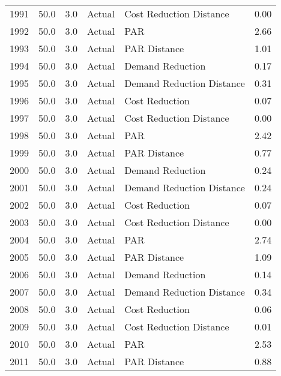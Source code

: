 \begin{longtable}{lrrllr}
1991 &         50.0 &     3.0 &         Actual &    Cost Reduction Distance &   0.00 \\
1992 &         50.0 &     3.0 &         Actual &                        PAR &   2.66 \\
1993 &         50.0 &     3.0 &         Actual &               PAR Distance &   1.01 \\
1994 &         50.0 &     3.0 &         Actual &           Demand Reduction &   0.17 \\
1995 &         50.0 &     3.0 &         Actual &  Demand Reduction Distance &   0.31 \\
1996 &         50.0 &     3.0 &         Actual &             Cost Reduction &   0.07 \\
1997 &         50.0 &     3.0 &         Actual &    Cost Reduction Distance &   0.00 \\
1998 &         50.0 &     3.0 &         Actual &                        PAR &   2.42 \\
1999 &         50.0 &     3.0 &         Actual &               PAR Distance &   0.77 \\
2000 &         50.0 &     3.0 &         Actual &           Demand Reduction &   0.24 \\
2001 &         50.0 &     3.0 &         Actual &  Demand Reduction Distance &   0.24 \\
2002 &         50.0 &     3.0 &         Actual &             Cost Reduction &   0.07 \\
2003 &         50.0 &     3.0 &         Actual &    Cost Reduction Distance &   0.00 \\
2004 &         50.0 &     3.0 &         Actual &                        PAR &   2.74 \\
2005 &         50.0 &     3.0 &         Actual &               PAR Distance &   1.09 \\
2006 &         50.0 &     3.0 &         Actual &           Demand Reduction &   0.14 \\
2007 &         50.0 &     3.0 &         Actual &  Demand Reduction Distance &   0.34 \\
2008 &         50.0 &     3.0 &         Actual &             Cost Reduction &   0.06 \\
2009 &         50.0 &     3.0 &         Actual &    Cost Reduction Distance &   0.01 \\
2010 &         50.0 &     3.0 &         Actual &                        PAR &   2.53 \\
2011 &         50.0 &     3.0 &         Actual &               PAR Distance &   0.88 \\

\end{longtable}
